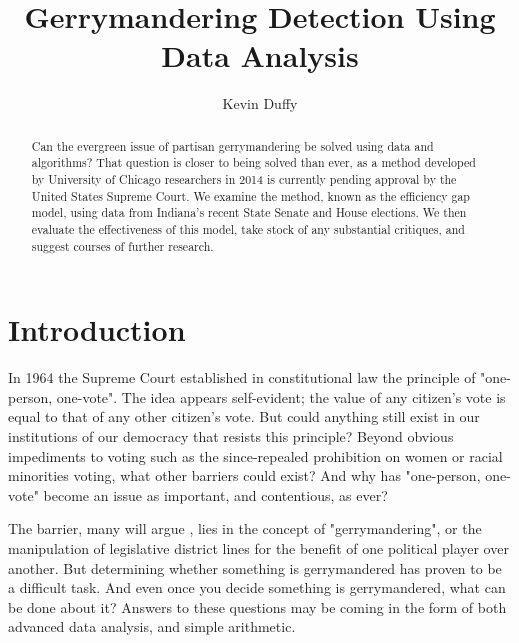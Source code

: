 \documentclass[sigconf]{acmart}
\begin{document}
\title{Gerrymandering Detection Using Data Analysis}

\author{Kevin Duffy}

\renewcommand{\shortauthors}{K. Duffy}

\begin{abstract}
Can the evergreen issue of partisan gerrymandering be solved using data and algorithms? That question is closer to being solved than ever, as a method developed by University of Chicago researchers in 2014 is currently pending approval by the United States Supreme Court. We examine the method, known as the efficiency gap model, using data from Indiana's recent State Senate and House elections. We then evaluate the effectiveness of this model, take stock of any substantial critiques, and suggest courses of further research.
\end{abstract}


\maketitle

\section{Introduction}
In 1964 the Supreme Court established in constitutional law the principle of "one-person, one-vote".\cite{oneperson} The idea appears self-evident; the value of any citizen's vote is equal to that of any other citizen's vote. But could anything still exist in our institutions of our democracy that resists this principle? Beyond obvious impediments to voting such as the since-repealed prohibition on women or racial minorities voting, what other barriers could exist? And why has "one-person, one-vote" become an issue as important, and contentious, as ever?

The barrier, many will argue \cite{wapo}\cite{chicago}\cite{thornburg}, lies in the concept of "gerrymandering", or the manipulation of legislative district lines for the benefit of one political player over another. But determining whether something is gerrymandered has proven to be a difficult task. And even once you decide something is gerrymandered, what can be done about it? Answers to these questions may be coming in the form of both advanced data analysis, and simple arithmetic.
\end{document}
